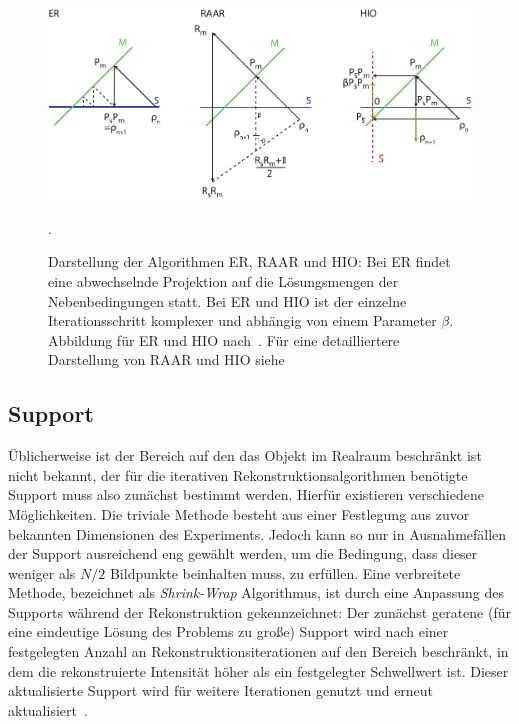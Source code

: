 \begin{figure}
	\centering
	\includegraphics[width=1\textwidth]{images/algorithmen.pdf}
	\caption[Rekonstruktionsalgorithmen]{Darstellung der Algorithmen ER, RAAR und HIO: Bei ER findet eine abwechselnde Projektion auf die Lösungsmengen der Nebenbedingungen statt. Bei ER und HIO ist der einzelne Iterationsschritt komplexer und abhängig von einem Parameter $\beta$. Abbildung für ER und HIO nach~\cite{marchesini2007}. Für eine detailliertere Darstellung von RAAR und HIO siehe }.
	\label{fig:recon}
\end{figure} 
\subsection{Support}
Üblicherweise ist der Bereich auf den das Objekt im Realraum beschränkt ist nicht bekannt, der für die iterativen Rekonstruktionsalgorithmen benötigte Support muss also zunächst bestimmt werden. Hierfür existieren verschiedene Möglichkeiten. Die triviale Methode besteht aus einer Festlegung aus zuvor bekannten Dimensionen des Experiments. Jedoch kann so nur in Ausnahmefällen der Support ausreichend eng gewählt werden, um die Bedingung, dass dieser weniger als $N/2$ Bildpunkte beinhalten muss, zu erfüllen.
Eine verbreitete Methode, bezeichnet als \textit{Shrink-Wrap} Algorithmus, ist durch eine Anpassung des Supports während der Rekonstruktion gekennzeichnet: Der zunächst geratene (für eine eindeutige Lösung des Problems  zu große) Support wird nach einer festgelegten Anzahl an Rekonstruktionsiterationen auf den Bereich beschränkt, in dem die rekonstruierte Intensität höher als ein festgelegter Schwellwert ist. Dieser aktualisierte Support wird für weitere Iterationen genutzt und erneut aktualisiert~\cite{marchesini2003}.

